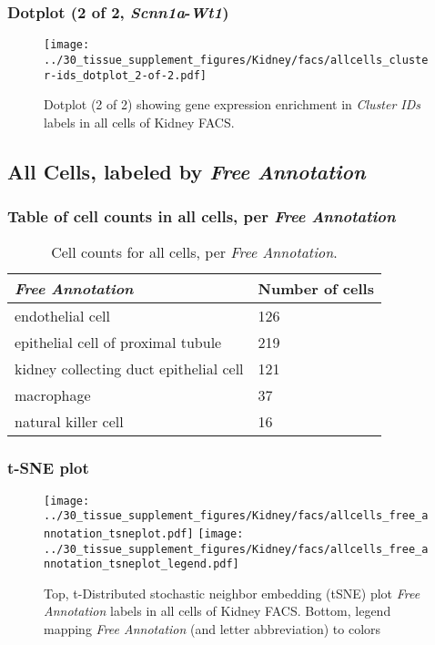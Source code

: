 \clearpage

\subsubsection{Dotplot (2 of 2, \emph{Scnn1a}-\emph{Wt1})}
\begin{figure}[h]
\centering
\texttt{[image: ../30\_tissue\_supplement\_figures/Kidney/facs/allcells\_cluster-ids\_dotplot\_2-of-2.pdf]}

\caption{ Dotplot (2 of 2)  showing gene expression enrichment in \emph{Cluster IDs} labels in all cells of Kidney FACS. }
\end{figure}


\clearpage

\subsection{All Cells, labeled by \emph{Free Annotation}}
\subsubsection{Table of cell counts in all cells, per \emph{Free Annotation}}\begin{table}[h]
\centering
\label{my-label}
\begin{tabular}{@{}ll@{}}
\toprule

\emph{Free Annotation}& Number of cells \\ \midrule
endothelial cell & 126 \\

epithelial cell of proximal tubule & 219 \\

kidney collecting duct epithelial cell & 121 \\

macrophage & 37 \\

natural killer cell & 16 \\
\bottomrule
\end{tabular}
\caption{Cell counts for all cells, per \emph{Free Annotation}.}
\end{table}

\clearpage
\subsubsection{t-SNE plot}
\begin{figure}[h]
\centering
\texttt{[image: ../30\_tissue\_supplement\_figures/Kidney/facs/allcells\_free\_annotation\_tsneplot.pdf]}
\texttt{[image: ../30\_tissue\_supplement\_figures/Kidney/facs/allcells\_free\_annotation\_tsneplot\_legend.pdf]}
\caption{Top, t-Distributed stochastic neighbor embedding (tSNE) plot  \emph{Free Annotation} labels in all cells of Kidney FACS. Bottom, legend mapping \emph{Free Annotation} (and letter abbreviation) to colors}
\end{figure}


